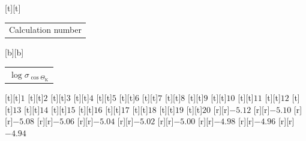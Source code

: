 %    
%
%
\begin{psfrags}%
\psfragscanon%
%
[t][t]{\color[rgb]{0,0,0}\setlength{\tabcolsep}{0pt}\begin{tabular}{c}{\Large{}Calculation number}\end{tabular}}%
[b][b]{\color[rgb]{0,0,0}\setlength{\tabcolsep}{0pt}\begin{tabular}{c}{\Large$\log \sigma_{\cos\Theta_\mathrm{K}}$\vspace{2mm}}\end{tabular}}%
%
[t][t]{$1$}%
[t][t]{$2$}%
[t][t]{$3$}%
[t][t]{$4$}%
[t][t]{$5$}%
[t][t]{$6$}%
[t][t]{$7$}%
[t][t]{$8$}%
[t][t]{$9$}%
[t][t]{$10$}%
[t][t]{$11$}%
[t][t]{$12$}%
[t][t]{$13$}%
[t][t]{$14$}%
[t][t]{$15$}%
[t][t]{$16$}%
[t][t]{$17$}%
[t][t]{$18$}%
[t][t]{$19$}%
[t][t]{$20$}%
%
[r][r]{$-5.12$}%
[r][r]{$-5.10$}%
[r][r]{$-5.08$}%
[r][r]{$-5.06$}%
[r][r]{$-5.04$}%
[r][r]{$-5.02$}%
[r][r]{$-5.00$}%
[r][r]{$-4.98$}%
[r][r]{$-4.96$}%
[r][r]{$-4.94$}%
%
%
\end{psfrags}%
%
